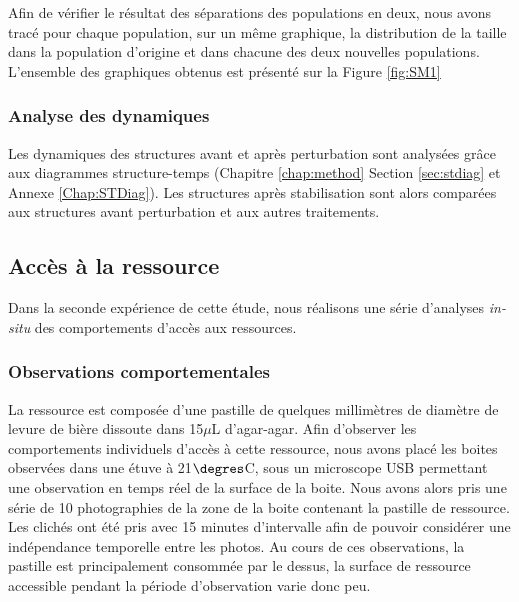 Afin de vérifier le résultat des séparations des populations en deux, nous avons
tracé pour chaque population, sur un même graphique, la distribution de la
taille dans la population d'origine et dans chacune des deux nouvelles
populations. L'ensemble des graphiques obtenus est présenté sur la Figure
\ref{fig:SM1}

\subsubsection{Analyse des dynamiques}

Les dynamiques des structures avant et après perturbation sont analysées grâce
aux diagrammes structure-temps (Chapitre \ref{chap:method} Section \ref{sec:stdiag} et
Annexe \ref{Chap:STDiag}).
Les structures après stabilisation sont alors comparées aux structures avant perturbation et
aux autres traitements. 

\subsection{Accès à la ressource}

Dans la seconde expérience de cette étude, nous réalisons une série d'analyses
\textit{in-situ} des comportements d'accès aux ressources.

\subsubsection{Observations comportementales}

La ressource est composée d'une pastille de quelques millimètres de diamètre de
levure de bière dissoute dans 15$\mu$L d'agar-agar. Afin d'observer les
comportements individuels d'accès à cette ressource, nous avons placé les boites
observées dans une étuve à 21$\degres$C, sous un microscope USB permettant une
observation en temps réel de la surface de la boite. Nous avons alors pris une
série de 10 photographies de la zone de la boite contenant la pastille de
ressource. Les clichés ont été pris avec 15 minutes d'intervalle afin de pouvoir
considérer une indépendance temporelle entre les photos. Au cours de ces
observations, la pastille est principalement consommée par le dessus, la surface
de ressource accessible pendant la période d'observation varie donc peu.

